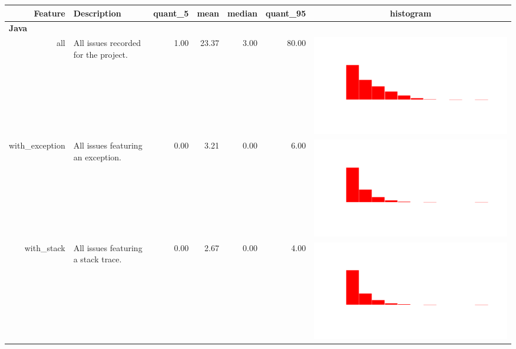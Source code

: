 \begin{table}[ht]
\centering
\begin{tabular}{rp{27em}rrrrc}
  \hline
Feature & Description & quant\_5 & mean & median & quant\_95 & histogram \\ 
  \hline
   \multicolumn{2}{l}{\bfseries{Java}}  \\
all & All issues recorded for the project. & 1.00 & 23.37 & 3.00 & 80.00 & \includegraphics[scale = 0.1, clip = true, trim= 50px 60px 50px 60px]{hist-31b77719e3773ad7ac2073785de62a5f.pdf} \\ 
  with\_exception & All issues featuring an exception. & 0.00 & 3.21 & 0.00 & 6.00 & \includegraphics[scale = 0.1, clip = true, trim= 50px 60px 50px 60px]{hist-0c1305fc40f695dbdd1f4696db24f147.pdf} \\ 
  with\_stack & All issues featuring a stack trace. & 0.00 & 2.67 & 0.00 & 4.00 & \includegraphics[scale = 0.1, clip = true, trim= 50px 60px 50px 60px]{hist-896524802e915aa3f01ef1ecd2489e7e.pdf} \\ 

\end{tabular}
\end{table}
